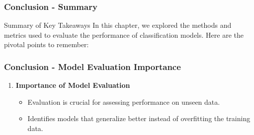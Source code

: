 \documentclass[aspectratio=169]{beamer}
\begin{document}
\begin{frame}[fragile]
    \frametitle{Conclusion - Summary}
    \begin{block}{Summary of Key Takeaways}
        In this chapter, we explored the methods and metrics used to evaluate the performance of classification models. Here are the pivotal points to remember:
    \end{block}
\end{frame}

\begin{frame}[fragile]
    \frametitle{Conclusion - Model Evaluation Importance}
    \begin{enumerate}
        \item \textbf{Importance of Model Evaluation}
        \begin{itemize}
            \item Evaluation is crucial for assessing performance on unseen data.
            \item Identifies models that generalize better instead of overfitting the training data.
        \end{itemize}
    \end{enumerate}
\end{frame}
\end{document}
